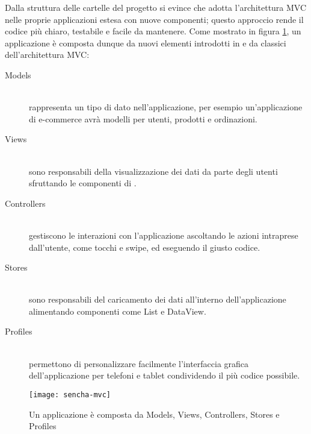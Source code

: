             Dalla struttura delle cartelle del progetto si evince che \senchat{} adotta
            l'architettura MVC nelle proprie applicazioni estesa con nuove componenti;
            questo approccio rende il codice più chiaro, testabile e facile da mantenere.
            Come mostrato in figura \ref{fig:sencha_mvc}, un applicazione è
            composta dunque da nuovi elementi introdotti in \senchat{} e da
            classici dell'architettura MVC:
            \begin{description}
                \item[Models]\hfill \\
                    rappresenta un tipo di dato nell'applicazione, per esempio
                    un'applicazione di e-commerce avrà modelli per utenti, prodotti
                    e ordinazioni.
                \item[Views]\hfill \\
                    sono responsabili della visualizzazione dei dati da parte
                    degli utenti sfruttando le componenti di \senchat{}.
                \item[Controllers]\hfill \\
                    gestiscono le interazioni con l'applicazione ascoltando le
                    azioni intraprese dall'utente, come tocchi e swipe, ed eseguendo
                    il giusto codice.
                \item[Stores]\hfill \\
                    sono responsabili del caricamento dei dati all'interno
                    dell'applicazione alimentando componenti come List e DataView.
                \item[Profiles]\hfill \\
                    permettono di personalizzare facilmente l'interfaccia grafica
                    dell'applicazione per telefoni e tablet condividendo il più
                    codice possibile.
            \end{description}
            \begin{figure}[h]
                \centering
                \texttt{[image: sencha-mvc]}
                \caption{
                    Un applicazione \senchat{} è composta da Models, Views,
                    Controllers, Stores e Profiles
                }
                \label{fig:sencha_mvc}
            \end{figure}

